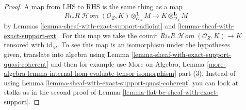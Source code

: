 \documentclass[10pt,a4paper]{amsart}
\theoremstyle{plain}
\theoremstyle{definition}
\theoremstyle{remark}
\numberwithin{equation}{subsection}
\def\SheafHom{\mathop{\mathcal{H}\!\mathit{om}}\nolimits}
\begin{document}
\begin{proof}
A map from LHS to RHS is the same thing as a map
$$
Ri_*R\SheafHom(\mathcal{O}_Z, K) \otimes_{\mathcal{O}_X}^\mathbf{L} M
\longrightarrow
K \otimes_{\mathcal{O}_X}^\mathbf{L} M
$$
by Lemmas \ref{lemma-sheaf-with-exact-support-adjoint} and
\ref{lemma-sheaf-with-exact-support-ext}. For this map we take the
counit $Ri_*R\SheafHom(\mathcal{O}_Z, K) \to K$ tensored with $\text{id}_M$.
To see this map is an isomorphism under the hypotheses given,
translate into algebra using
Lemma \ref{lemma-sheaf-with-exact-support-quasi-coherent}
and then for example use More on Algebra, Lemma
\ref{more-algebra-lemma-internal-hom-evaluate-tensor-isomorphism} part (3).
Instead of using Lemma \ref{lemma-sheaf-with-exact-support-quasi-coherent}
you can look at stalks as in the second proof of
Lemma \ref{lemma-flat-bc-sheaf-with-exact-support}.
\end{proof}
\end{document}
